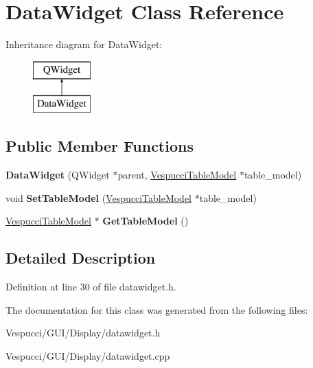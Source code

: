 \hypertarget{class_data_widget}{}\section{Data\+Widget Class Reference}
\label{class_data_widget}
Inheritance diagram for Data\+Widget\+:\begin{figure}[H]
\begin{center}
\leavevmode
\includegraphics[height=2.000000cm]{class_data_widget}
\end{center}
\end{figure}
\subsection*{Public Member Functions}
\begin{DoxyCompactItemize}
\item 
{\bfseries Data\+Widget} (Q\+Widget $\ast$parent, \hyperlink{class_vespucci_table_model}{Vespucci\+Table\+Model} $\ast$table\+\_\+model)\hypertarget{class_data_widget_a174ea64da70aa2804acdb3fe2cfdf36f}{}\label{class_data_widget_a174ea64da70aa2804acdb3fe2cfdf36f}

\item 
void {\bfseries Set\+Table\+Model} (\hyperlink{class_vespucci_table_model}{Vespucci\+Table\+Model} $\ast$table\+\_\+model)\hypertarget{class_data_widget_a67dff1faa11bde1cecff0608c3856301}{}\label{class_data_widget_a67dff1faa11bde1cecff0608c3856301}

\item 
\hyperlink{class_vespucci_table_model}{Vespucci\+Table\+Model} $\ast$ {\bfseries Get\+Table\+Model} ()\hypertarget{class_data_widget_ac2a4a6e07971f424b5243b00f0b28fd4}{}\label{class_data_widget_ac2a4a6e07971f424b5243b00f0b28fd4}

\end{DoxyCompactItemize}


\subsection{Detailed Description}


Definition at line 30 of file datawidget.\+h.



The documentation for this class was generated from the following files\+:\begin{DoxyCompactItemize}
\item 
Vespucci/\+G\+U\+I/\+Display/datawidget.\+h\item 
Vespucci/\+G\+U\+I/\+Display/datawidget.\+cpp\end{DoxyCompactItemize}
